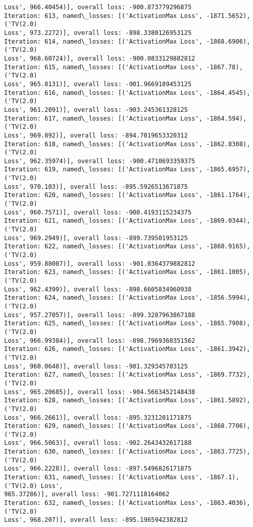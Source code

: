 \documentclass[10pt]{article}
\begin{document}
\begin{Verbatim}[commandchars=\\\{\}]
Loss', 966.40454)], overall loss: -900.873779296875
Iteration: 613, named\_losses: [('ActivationMax Loss', -1871.5652), ('TV(2.0)
Loss', 973.2272)], overall loss: -898.3380126953125
Iteration: 614, named\_losses: [('ActivationMax Loss', -1868.6906), ('TV(2.0)
Loss', 968.60724)], overall loss: -900.0833129882812
Iteration: 615, named\_losses: [('ActivationMax Loss', -1867.78), ('TV(2.0)
Loss', 965.8131)], overall loss: -901.9669189453125
Iteration: 616, named\_losses: [('ActivationMax Loss', -1864.4545), ('TV(2.0)
Loss', 961.2091)], overall loss: -903.245361328125
Iteration: 617, named\_losses: [('ActivationMax Loss', -1864.594), ('TV(2.0)
Loss', 969.892)], overall loss: -894.7019653320312
Iteration: 618, named\_losses: [('ActivationMax Loss', -1862.8308), ('TV(2.0)
Loss', 962.35974)], overall loss: -900.4710693359375
Iteration: 619, named\_losses: [('ActivationMax Loss', -1865.6957), ('TV(2.0)
Loss', 970.103)], overall loss: -895.5926513671875
Iteration: 620, named\_losses: [('ActivationMax Loss', -1861.1764), ('TV(2.0)
Loss', 960.7571)], overall loss: -900.4193115234375
Iteration: 621, named\_losses: [('ActivationMax Loss', -1869.0344), ('TV(2.0)
Loss', 969.2949)], overall loss: -899.739501953125
Iteration: 622, named\_losses: [('ActivationMax Loss', -1860.9165), ('TV(2.0)
Loss', 959.88007)], overall loss: -901.0364379882812
Iteration: 623, named\_losses: [('ActivationMax Loss', -1861.1005), ('TV(2.0)
Loss', 962.4399)], overall loss: -898.6605834960938
Iteration: 624, named\_losses: [('ActivationMax Loss', -1856.5994), ('TV(2.0)
Loss', 957.27057)], overall loss: -899.3287963867188
Iteration: 625, named\_losses: [('ActivationMax Loss', -1865.7908), ('TV(2.0)
Loss', 966.99384)], overall loss: -898.7969360351562
Iteration: 626, named\_losses: [('ActivationMax Loss', -1861.3942), ('TV(2.0)
Loss', 960.0648)], overall loss: -901.329345703125
Iteration: 627, named\_losses: [('ActivationMax Loss', -1869.7732), ('TV(2.0)
Loss', 965.20685)], overall loss: -904.5663452148438
Iteration: 628, named\_losses: [('ActivationMax Loss', -1861.5892), ('TV(2.0)
Loss', 966.2661)], overall loss: -895.3231201171875
Iteration: 629, named\_losses: [('ActivationMax Loss', -1868.7706), ('TV(2.0)
Loss', 966.5063)], overall loss: -902.2643432617188
Iteration: 630, named\_losses: [('ActivationMax Loss', -1863.7725), ('TV(2.0)
Loss', 966.2228)], overall loss: -897.5496826171875
Iteration: 631, named\_losses: [('ActivationMax Loss', -1867.1), ('TV(2.0) Loss',
965.37286)], overall loss: -901.7271118164062
Iteration: 632, named\_losses: [('ActivationMax Loss', -1863.4036), ('TV(2.0)
Loss', 968.207)], overall loss: -895.1965942382812

\end{Verbatim}
\end{document}
